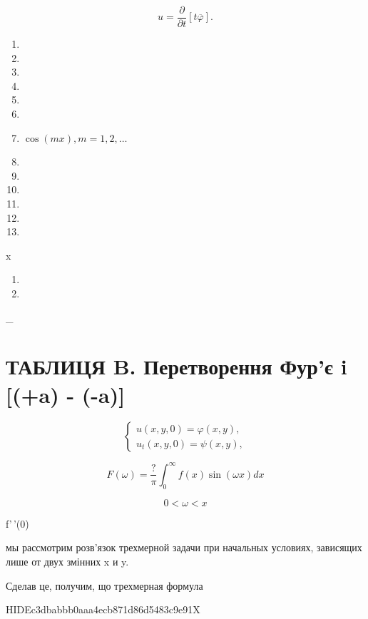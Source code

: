 \documentclass[
  ukrainian,
]{article}
\providecommand{\tightlist}{%
  \setlength{\itemsep}{0pt}\setlength{\parskip}{0pt}}
\begin{document}
\[
u = \frac{\partial}{\partial t} [t\overline{\varphi}].
\]

\begin{enumerate}
\def\labelenumi{\arabic{enumi}.}
\setcounter{enumi}{18}
\item
\item
\item
\item
\item
\item
\item
  \(\cos(mx), m=1, 2, \dots\)
\item
\item
\item
\item
\item
\item
\end{enumerate}

x

\begin{enumerate}
\def\labelenumi{\arabic{enumi}.}
\setcounter{enumi}{18}
\tightlist
\item
\item
\end{enumerate}

\textbar{} \_ \textbar{}

\section{\texorpdfstring{ТАБЛИЦЯ B. Перетворення Фур'є i
 {[}\delta(\omega+a) -
\delta(\omega-a){]}}{ТАБЛИЦЯ B. Перетворення Фур'є i  {[}(+a) - (-a){]}}}\label{ux442ux430ux431ux43bux438ux446ux44f-b.-ux43fux435ux440ux435ux442ux432ux43eux440ux435ux43dux43dux44f-ux444ux443ux440ux454-i-a----a-1}

\[
\begin{cases} u(x, y, 0) = \varphi(x, y), \\ u_t(x, y, 0) = \psi(x, y), \end{cases}
\]

\[
F(\omega) = \frac{?}{\pi} \int_{0}^{\infty} f(x) \sin(\omega x) dx
\]

\[
0 < \omega < x
\]

f'\,'(0)

мы рассмотрим розв'язок трехмерной задачи при начальных условиях,
зависящих лише от двух змінних x и y.

Сделав це, получим, що трехмерная формула

HIDEc3dbabbb0aaa4ecb871d86d5483c9e91X
\end{document}
